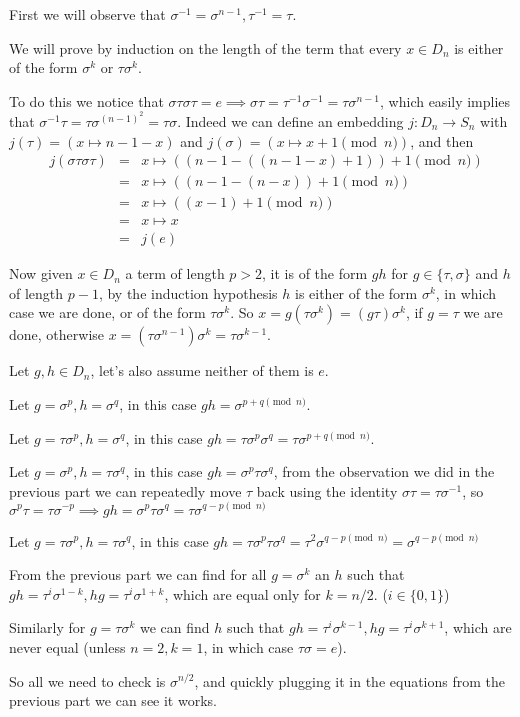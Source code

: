 \begin{cExercise}
	\begin{cPart}
		First we will observe that $\sigma^{-1}=\sigma^{n-1},\tau^{-1}=\tau$.
		
		We will prove by induction on the length of the term that every $x\in D_n$ is either of the form $\sigma^k$ or $\tau\sigma^k$.
		
		To do this we notice that $\sigma\tau\sigma\tau=e\implies\sigma\tau=\tau^{-1}\sigma^{-1}=\tau\sigma^{n-1}$, which easily implies that $\sigma^{-1}\tau=\tau\sigma^{(n-1)^2}=\tau\sigma$. Indeed we can define an embedding $j:D_n\to S_n$ with $j(\tau)=(x\mapsto n-1-x)$ and $j(\sigma)=(x\mapsto x+1\pmod n)$, and then
		\begin{align*}
			&j(\sigma\tau\sigma\tau)&=&x\mapsto ((n-1-((n-1-x)+1))+1\pmod n)\\
			&&=&x\mapsto ((n-1-(n-x))+1\pmod n)\\
			&&=&x\mapsto ((x-1)+1\pmod n)\\
			&&=&x\mapsto x\\
			&&=&j(e)
		\end{align*}
		
		Now given $x\in D_n$ a term of length $p>2$, it is of the form $gh$ for $g\in\{\tau,\sigma\}$ and $h$ of length $p-1$, by the induction hypothesis $h$ is either of the form $\sigma^k$, in which case we are done, or of the form $\tau\sigma^k$. So $x=g(\tau\sigma^{k})=(g\tau)\sigma^k$, if $g=\tau$ we are done, otherwise $x=(\tau\sigma^{n-1})\sigma^k=\tau\sigma^{k-1}$.
	\end{cPart}
	\begin{cPart}
		Let $g,h\in D_n$, let's also assume neither of them is $e$.
		
		Let $g=\sigma^p,h=\sigma^q$, in this case $gh=\sigma^{p+q\pmod n}$.
		
		Let $g=\tau \sigma^p,h=\sigma^q$, in this case $gh=\tau\sigma^p\sigma^q=\tau\sigma^{p+q\pmod n}$.
		
		Let $g=\sigma^p,h=\tau\sigma^q$, in this case $gh=\sigma^p\tau\sigma^q$, from the observation we did in the previous part we can repeatedly move $\tau$ back using the identity $\sigma\tau=\tau\sigma^{-1}$, so $\sigma^p\tau=\tau\sigma^{-p}\implies gh=\sigma^p\tau\sigma^q=\tau\sigma^{q-p\pmod n}$
		
		Let $g=\tau \sigma^p,h=\tau\sigma^q$, in this case $gh=\tau\sigma^p\tau\sigma^q=\tau^2\sigma^{q-p\pmod n}=\sigma^{q-p\pmod n}$
	\end{cPart}
	\begin{cPart}
		From the previous part we can find for all $g=\sigma^k$ an $h$ such that $gh=\tau^i\sigma^{1-k},hg=\tau^i\sigma^{1+k}$, which are equal only for $k=n/2$. ($i\in\{0,1\}$)
		
		Similarly for $g=\tau\sigma^k$ we can find $h$ such that $gh=\tau^i\sigma^{k-1},hg=\tau^i\sigma^{k+1}$, which are never equal (unless $n=2,k=1$, in which case $\tau\sigma=e$).
		
		So all we need to check is $\sigma^{n/2}$, and quickly plugging it in the equations from the previous part we can see it works.
	\end{cPart}
\end{cExercise}
